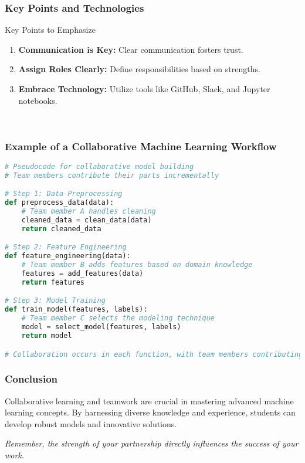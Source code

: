 \documentclass[aspectratio=169]{beamer}
\begin{document}
\begin{frame}[fragile]
    \frametitle{Key Points and Technologies}
    \begin{block}{Key Points to Emphasize}
        \begin{enumerate}
            \item \textbf{Communication is Key:} Clear communication fosters trust.
            \item \textbf{Assign Roles Clearly:} Define responsibilities based on strengths.
            \item \textbf{Embrace Technology:} Utilize tools like GitHub, Slack, and Jupyter notebooks.
        \end{enumerate}
    \end{block}
\    
\end{frame}

\begin{frame}[fragile]
    \frametitle{Example of a Collaborative Machine Learning Workflow}
    \begin{lstlisting}[language=Python]
# Pseudocode for collaborative model building
# Team members contribute their parts incrementally

# Step 1: Data Preprocessing
def preprocess_data(data):
    # Team member A handles cleaning
    cleaned_data = clean_data(data)
    return cleaned_data

# Step 2: Feature Engineering
def feature_engineering(data):
    # Team member B adds features based on domain knowledge
    features = add_features(data)
    return features

# Step 3: Model Training
def train_model(features, labels):
    # Team member C selects the modeling technique
    model = select_model(features, labels)
    return model

# Collaboration occurs in each function, with team members contributing expertise.
    \end{lstlisting}
\end{frame}

\begin{frame}[fragile]
    \frametitle{Conclusion}
    Collaborative learning and teamwork are crucial in mastering advanced machine learning concepts. By harnessing diverse knowledge and experience, students can develop robust models and innovative solutions.
    
    \textit{Remember, the strength of your partnership directly influences the success of your work.}
\end{frame}
\end{document}

